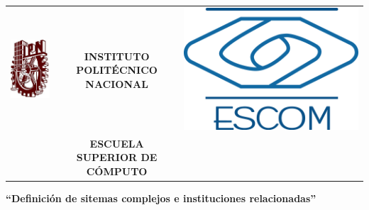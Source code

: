 \begin{titlepage}
    \begin{center}
    \begin{tabular}{r c l}
    \includegraphics[scale=.20]{images/ipn} & \textbf{INSTITUTO POLIT\'ECNICO NACIONAL} & \includegraphics[scale=.20]{images/escom}\\
    & \textbf{ESCUELA SUPERIOR DE C\'OMPUTO}
    \end{tabular}
    \end{center}


    \vspace{1.5cm}
    \begin{center}

    \large \textbf{``Definición de sitemas complejos e instituciones relacionadas''} \linebreak


\end{center}
\end{titlepage}
